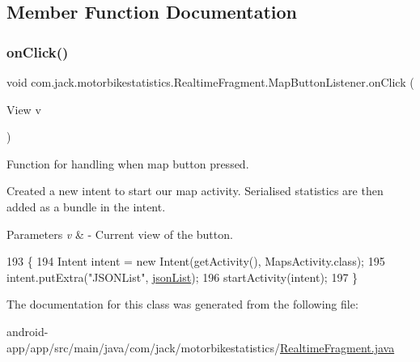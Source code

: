 \subsection{Member Function Documentation}
\mbox{\label{classcom_1_1jack_1_1motorbikestatistics_1_1_realtime_fragment_1_1_map_button_listener_a6d7946385193fabf809155132ea721de}} 
\subsubsection{\texorpdfstring{on\+Click()}{onClick()}}
{\footnotesize\ttfamily void com.\+jack.\+motorbikestatistics.\+Realtime\+Fragment.\+Map\+Button\+Listener.\+on\+Click (\begin{DoxyParamCaption}\item[{View}]{v }\end{DoxyParamCaption})\hspace{0.3cm}{\ttfamily [inline]}}



Function for handling when map button pressed. 

Created a new intent to start our map activity. Serialised statistics are then added as a bundle in the intent.


\begin{DoxyParams}{Parameters}
{\em v} & -\/ Current view of the button. \\
\hline
\end{DoxyParams}

\begin{DoxyCode}
193                                   \{
194           Intent intent = \textcolor{keyword}{new} Intent(getActivity(), MapsActivity.class);
195           intent.putExtra(\textcolor{stringliteral}{"JSONList"}, \hyperlink{classcom_1_1jack_1_1motorbikestatistics_1_1_realtime_fragment_aeaf4c36f29c56ec961bda017de9cc671}{jsonList});
196           startActivity(intent);
197       \}
\end{DoxyCode}


The documentation for this class was generated from the following file\+:\begin{DoxyCompactItemize}
\item 
android-\/app/app/src/main/java/com/jack/motorbikestatistics/\hyperlink{_realtime_fragment_8java}{Realtime\+Fragment.\+java}\end{DoxyCompactItemize}
